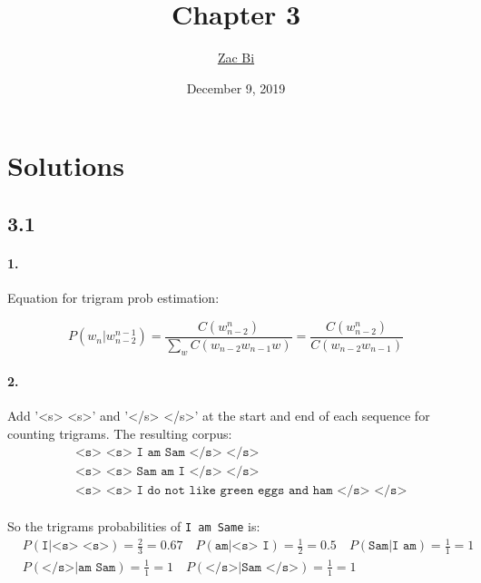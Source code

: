 \documentclass{article}
\begin{document}
\begin{titlepage}
    \title{Chapter 3}
    \author{\href{https://github.com/ZacBi}{Zac Bi}}
    \date{December 9, 2019}
    \maketitle
    \thispagestyle{empty}
\end{titlepage}


\section*{Solutions}

\subsection*{3.1}
\paragraph{1.}
Equation for trigram prob estimation:

$$P(w_n|w_{n-2}^{n-1}) =  \displaystyle\frac{C(w_{n-2}^{n})}{\sum_{w} C(w_{n-2} w_{n-1} w)} = \displaystyle\frac{C(w_{n-2}^{n})}{C(w_{n-2} w_{n-1})}$$

\paragraph{2.}
Add '<s> <s>' and '</s> </s>' at the start and end  of each sequence for counting trigrams.
The resulting corpus:
\begin{align*}
     & \texttt{<s> <s> I am Sam </s> </s>}                         \\
     & \texttt{<s> <s> Sam am I </s> </s>}                         \\
     & \texttt{<s> <s> I do not like green eggs and ham </s> </s>}
\end{align*}

\paragraph{}
So the trigrams probabilities of \texttt{I am Same} is:
\begin{align*}
     & P(\texttt{I|<s> <s>}) = \frac{2}{3} = 0.67 \quad
    P(\texttt{am|<s> I}) = \frac{1}{2} = 0.5 \quad
    P(\texttt{Sam|I am}) = \frac{1}{1} = 1              \\
     & P(\texttt{</s>|am Sam}) = \frac{1}{1} = 1 \quad
    P(\texttt{</s>|Sam </s>}) = \frac{1}{1} = 1 \quad
\end{align*}
\end{document}

